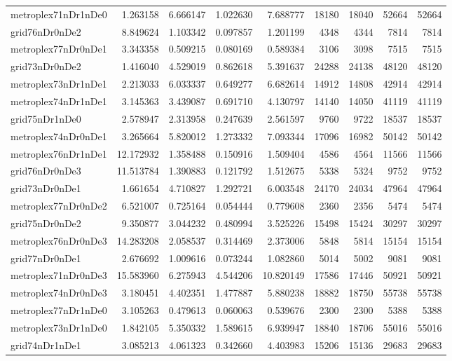 \begin{longtable}{|l|r|r|r|r|r|r|r|r|}
metroplex71nDr1nDe0 & 1.263158 & 6.666147 & 1.022630 & 7.688777 & 18180 & 18040 & 52664 & 52664 \\
grid76nDr0nDe2 & 8.849624 & 1.103342 & 0.097857 & 1.201199 & 4348 & 4344 & 7814 & 7814 \\
metroplex77nDr0nDe1 & 3.343358 & 0.509215 & 0.080169 & 0.589384 & 3106 & 3098 & 7515 & 7515 \\
grid73nDr0nDe2 & 1.416040 & 4.529019 & 0.862618 & 5.391637 & 24288 & 24138 & 48120 & 48120 \\
metroplex73nDr1nDe1 & 2.213033 & 6.033337 & 0.649277 & 6.682614 & 14912 & 14808 & 42914 & 42914 \\
metroplex74nDr1nDe1 & 3.145363 & 3.439087 & 0.691710 & 4.130797 & 14140 & 14050 & 41119 & 41119 \\
grid75nDr1nDe0 & 2.578947 & 2.313958 & 0.247639 & 2.561597 & 9760 & 9722 & 18537 & 18537 \\
metroplex74nDr0nDe1 & 3.265664 & 5.820012 & 1.273332 & 7.093344 & 17096 & 16982 & 50142 & 50142 \\
metroplex76nDr1nDe1 & 12.172932 & 1.358488 & 0.150916 & 1.509404 & 4586 & 4564 & 11566 & 11566 \\
grid76nDr0nDe3 & 11.513784 & 1.390883 & 0.121792 & 1.512675 & 5338 & 5324 & 9752 & 9752 \\
grid73nDr0nDe1 & 1.661654 & 4.710827 & 1.292721 & 6.003548 & 24170 & 24034 & 47964 & 47964 \\
metroplex77nDr0nDe2 & 6.521007 & 0.725164 & 0.054444 & 0.779608 & 2360 & 2356 & 5474 & 5474 \\
grid75nDr0nDe2 & 9.350877 & 3.044232 & 0.480994 & 3.525226 & 15498 & 15424 & 30297 & 30297 \\
metroplex76nDr0nDe3 & 14.283208 & 2.058537 & 0.314469 & 2.373006 & 5848 & 5814 & 15154 & 15154 \\
grid77nDr0nDe1 & 2.676692 & 1.009616 & 0.073244 & 1.082860 & 5014 & 5002 & 9081 & 9081 \\
metroplex71nDr0nDe3 & 15.583960 & 6.275943 & 4.544206 & 10.820149 & 17586 & 17446 & 50921 & 50921 \\
metroplex74nDr0nDe3 & 3.180451 & 4.402351 & 1.477887 & 5.880238 & 18882 & 18750 & 55738 & 55738 \\
metroplex77nDr1nDe0 & 3.105263 & 0.479613 & 0.060063 & 0.539676 & 2300 & 2300 & 5388 & 5388 \\
metroplex73nDr1nDe0 & 1.842105 & 5.350332 & 1.589615 & 6.939947 & 18840 & 18706 & 55016 & 55016 \\
grid74nDr1nDe1 & 3.085213 & 4.061323 & 0.342660 & 4.403983 & 15206 & 15136 & 29683 & 29683 \\

\end{longtable}
